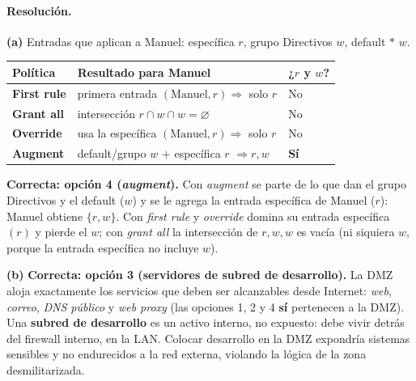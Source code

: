 \paragraph{Resolución.}
\textbf{(a)} Entradas que aplican a Manuel: específica $r$, grupo Directivos $w$, default $\ast$ $w$.
\begin{center}
\renewcommand{\arraystretch}{1.3}
\begin{tabular}{>{\bfseries}l l l}
\toprule
Política & Resultado para Manuel & ¿$r$ y $w$? \\
\midrule
First rule & primera entrada $(\text{Manuel},r)\Rightarrow$ solo $r$ & No \\
Grant all  & intersección $r\cap w\cap w = \varnothing$ & No \\
Override   & usa la específica $(\text{Manuel},r)\Rightarrow$ solo $r$ & No \\
Augment    & default/grupo $w$ $+$ específica $r$ $\Rightarrow r,w$ & \textbf{Sí} \\
\bottomrule
\end{tabular}
\end{center}
\textbf{Correcta: opción 4 (\emph{augment}).} Con \emph{augment} se parte de lo que dan el grupo Directivos y el default ($w$) y se le agrega la entrada específica de Manuel ($r$): Manuel obtiene $\{r,w\}$. Con \emph{first rule} y \emph{override} domina su entrada específica $(r)$ y pierde el $w$; con \emph{grant all} la intersección de $r,w,w$ es vacía (ni siquiera $w$, porque la entrada específica no incluye $w$).

\textbf{(b)} \textbf{Correcta: opción 3 (servidores de subred de desarrollo).} La DMZ aloja exactamente los servicios que deben ser alcanzables desde Internet: \emph{web}, \emph{correo}, \emph{DNS público} y \emph{web proxy} (las opciones 1, 2 y 4 \textbf{sí} pertenecen a la DMZ). Una \textbf{subred de desarrollo} es un activo interno, no expuesto: debe vivir detrás del firewall interno, en la LAN. Colocar desarrollo en la DMZ expondría sistemas sensibles y no endurecidos a la red externa, violando la lógica de la zona desmilitarizada.
